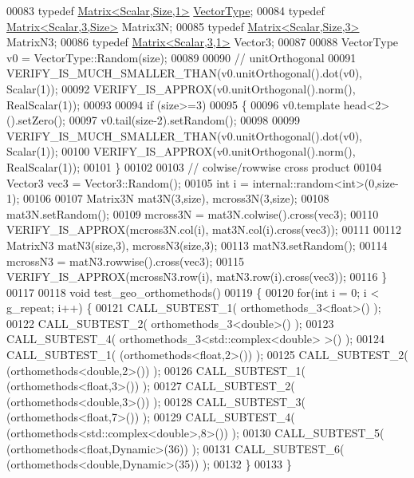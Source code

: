 \begin{DoxyCode}
00083   \textcolor{keyword}{typedef} \hyperlink{group___core___module_class_eigen_1_1_matrix}{Matrix<Scalar,Size,1>} \hyperlink{struct_vector_type}{VectorType};
00084   \textcolor{keyword}{typedef} \hyperlink{group___core___module_class_eigen_1_1_matrix}{Matrix<Scalar,3,Size>} Matrix3N;
00085   \textcolor{keyword}{typedef} \hyperlink{group___core___module_class_eigen_1_1_matrix}{Matrix<Scalar,Size,3>} MatrixN3;
00086   \textcolor{keyword}{typedef} \hyperlink{group___core___module}{Matrix<Scalar,3,1>} Vector3;
00087 
00088   VectorType v0 = VectorType::Random(size);
00089 
00090   \textcolor{comment}{// unitOrthogonal}
00091   VERIFY\_IS\_MUCH\_SMALLER\_THAN(v0.unitOrthogonal().dot(v0), Scalar(1));
00092   VERIFY\_IS\_APPROX(v0.unitOrthogonal().norm(), RealScalar(1));
00093 
00094   \textcolor{keywordflow}{if} (size>=3)
00095   \{
00096     v0.template head<2>().setZero();
00097     v0.tail(size-2).setRandom();
00098 
00099     VERIFY\_IS\_MUCH\_SMALLER\_THAN(v0.unitOrthogonal().dot(v0), Scalar(1));
00100     VERIFY\_IS\_APPROX(v0.unitOrthogonal().norm(), RealScalar(1));
00101   \}
00102 
00103   \textcolor{comment}{// colwise/rowwise cross product}
00104   Vector3 vec3 = Vector3::Random();
00105   \textcolor{keywordtype}{int} i = internal::random<int>(0,size-1);
00106 
00107   Matrix3N mat3N(3,size), mcross3N(3,size);
00108   mat3N.setRandom();
00109   mcross3N = mat3N.colwise().cross(vec3);
00110   VERIFY\_IS\_APPROX(mcross3N.col(i), mat3N.col(i).cross(vec3));
00111 
00112   MatrixN3 matN3(size,3), mcrossN3(size,3);
00113   matN3.setRandom();
00114   mcrossN3 = matN3.rowwise().cross(vec3);
00115   VERIFY\_IS\_APPROX(mcrossN3.row(i), matN3.row(i).cross(vec3));
00116 \}
00117 
00118 \textcolor{keywordtype}{void} test\_geo\_orthomethods()
00119 \{
00120   \textcolor{keywordflow}{for}(\textcolor{keywordtype}{int} i = 0; i < g\_repeat; i++) \{
00121     CALL\_SUBTEST\_1( orthomethods\_3<float>() );
00122     CALL\_SUBTEST\_2( orthomethods\_3<double>() );
00123     CALL\_SUBTEST\_4( orthomethods\_3<std::complex<double> >() );
00124     CALL\_SUBTEST\_1( (orthomethods<float,2>()) );
00125     CALL\_SUBTEST\_2( (orthomethods<double,2>()) );
00126     CALL\_SUBTEST\_1( (orthomethods<float,3>()) );
00127     CALL\_SUBTEST\_2( (orthomethods<double,3>()) );
00128     CALL\_SUBTEST\_3( (orthomethods<float,7>()) );
00129     CALL\_SUBTEST\_4( (orthomethods<std::complex<double>,8>()) );
00130     CALL\_SUBTEST\_5( (orthomethods<float,Dynamic>(36)) );
00131     CALL\_SUBTEST\_6( (orthomethods<double,Dynamic>(35)) );
00132   \}
00133 \}
\end{DoxyCode}
